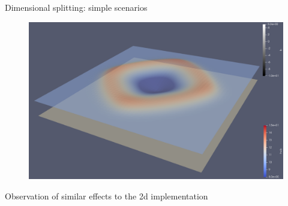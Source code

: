 \documentclass[shortpres]{beamer}
\newcommand{\imgfullscale}{0.75}
\begin{document}
\begin{frame}{Dimensional splitting: simple scenarios}
	\begin{figure}
			\includegraphics[clip, width=\imgfullscale\linewidth]{img/3d_bathy.png}
	\end{figure}
	Observation of similar effects to the 2d implementation
\end{frame}
\end{document}
